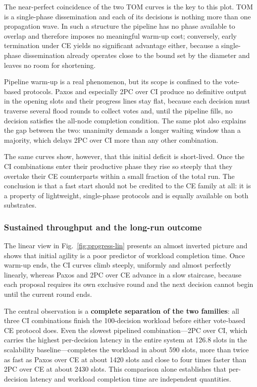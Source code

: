 \documentclass[journal]{IEEEtran}
\newcommand{\CI}{CI}                      %
\newcommand{\CE}{CE}                      %
\begin{document}
The near-perfect coincidence of the two TOM curves is the key to this
plot. TOM is a single-phase dissemination and each of its decisions is
nothing more than one propagation wave. In such a structure the pipeline
has no phase available to overlap and therefore imposes no meaningful
warm-up cost; conversely, early termination under \CE{} yields no
significant advantage either, because a single-phase dissemination already
operates close to the bound set by the diameter and leaves no room for
shortening.

Pipeline warm-up is a real phenomenon, but its scope is confined to the
vote-based protocols. Paxos and especially 2PC over \CI{} produce no
definitive output in the opening slots and their progress lines stay flat,
because each decision must traverse several flood rounds to collect votes
and, until the pipeline fills, no decision satisfies the all-node
completion condition. The same plot also explains the gap between the two:
unanimity demands a longer waiting window than a majority, which delays
2PC over \CI{} more than any other combination.

The same curves show, however, that this initial deficit is short-lived.
Once the \CI{} combinations enter their productive phase they rise so
steeply that they overtake their \CE{} counterparts within a small
fraction of the total run. The conclusion is that a fast start should not
be credited to the \CE{} family at all: it is a property of lightweight,
single-phase protocols and is equally available on both substrates.

\subsubsection{Sustained throughput and the long-run outcome}


The linear view in Fig.~\ref{fig:progress-lin} presents an almost
inverted picture and shows that initial agility is a poor predictor of
workload completion time. Once warm-up
ends, the \CI{} curves climb steeply, uniformly and almost perfectly
linearly, whereas Paxos and 2PC over \CE{} advance in a slow staircase,
because each proposal requires its own exclusive round and the next
decision cannot begin until the current round ends.

The central observation is a \textbf{complete separation of the two
families}: all three \CI{} combinations finish the 100-decision workload
before either vote-based \CE{} protocol does. Even the slowest pipelined
combination---2PC over \CI, which carries the highest per-decision
latency in the entire system at 126.8 slots in the scalability baseline---completes the workload
in about 590 slots, more than twice as fast as Paxos over \CE{} at about
1420 slots and close to four times faster than 2PC over \CE{} at about
2430 slots. This comparison alone establishes that per-decision latency
and workload completion time are independent quantities.
\end{document}
